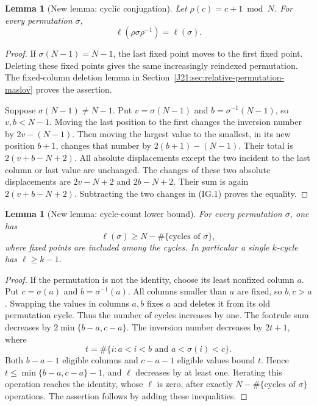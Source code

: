 \documentclass[11pt,oneside]{report}
\newtheorem{lemma}[theorem]{Lemma}
\theoremstyle{definition}
\numberwithin{equation}{section}
\begin{document}
\begin{lemma}[New lemma: cyclic conjugation]
\label{J21:lem:torus-cyclic-conjugation}
Let $\rho(c)=c+1\bmod N$. For every permutation $\sigma$,
\[
                     \ell(\rho\sigma\rho^{-1})=\ell(\sigma).
\]
\end{lemma}
\begin{proof}
If $\sigma(N-1)=N-1$, the last fixed point moves to the first fixed
point. Deleting these fixed points gives the same increasingly
reindexed permutation. The fixed-column deletion lemma in
Section~\ref{J21:sec:relative-permutation-maslov} proves the assertion.

Suppose $\sigma(N-1)\neq N-1$. Put $v=\sigma(N-1)$ and
$b=\sigma^{-1}(N-1)$, so $v,b<N-1$.
Moving the last position to the first changes the inversion number
by $2v-(N-1)$. Then moving the largest value to the smallest, in its
new position $b+1$, changes that number by
$2(b+1)-(N-1)$. Their total is $2(v+b-N+2)$.
All absolute displacements except the two incident to the last
column or last value are unchanged. The changes of these two
absolute displacements are $2v-N+2$ and $2b-N+2$.
Their sum is again $2(v+b-N+2)$. Subtracting the two changes in
(IG.1) proves the equality.
\end{proof}

\begin{lemma}[New lemma: cycle-count lower bound]
\label{J21:lem:torus-cycle-lower-bound}
For every permutation $\sigma$, one has
\[
                \ell(\sigma)\geq N-\#\{\text{cycles of }\sigma\},
\]
where fixed points are included among the cycles.
In particular a single $k$-cycle has $\ell\geq k-1$.
\end{lemma}
\begin{proof}
If the permutation is not the identity, choose its least nonfixed
column $a$. Put $c=\sigma(a)$ and $b=\sigma^{-1}(a)$.
All columns smaller than $a$ are fixed, so $b,c>a$.
Swapping the values in columns $a,b$ fixes $a$ and deletes it from
its old permutation cycle. Thus the number of cycles increases by one.
The footrule sum decreases by $2\min\{b-a,c-a\}$.
The inversion number decreases by $2t+1$, where
\[
                  t=\#\{i:a<i<b\text{ and }a<\sigma(i)<c\}.
\]
Both $b-a-1$ eligible columns and $c-a-1$ eligible values bound $t$.
Hence $t\leq\min\{b-a,c-a\}-1$, and $\ell$ decreases by at least
one. Iterating this operation reaches the identity, whose $\ell$
is zero, after exactly $N-\#\{\text{cycles of }\sigma\}$ operations.
The assertion follows by adding these inequalities.
\end{proof}
\end{document}
